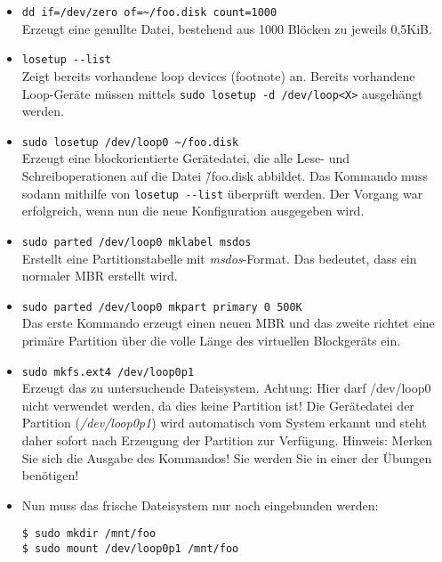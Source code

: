 \documentclass[11pt,a4paper]{article}
\def\inlinebash{\lstinline[style=bash]}
\begin{document}
\begin{itemize}
\item \inlinebash$dd if=/dev/zero of=~/foo.disk count=1000$\\
	Erzeugt eine genullte Datei, bestehend aus 1000 Blöcken zu jeweils 0,5KiB.

\item \inlinebash$losetup --list$\\
	Zeigt bereits vorhandene loop devices (footnote) an. Bereits vorhandene Loop-Geräte
	müssen mittels \inlinebash$sudo losetup -d /dev/loop<X>$ ausgehängt werden. 

\item \inlinebash$sudo losetup /dev/loop0 ~/foo.disk$\\
	Erzeugt eine blockorientierte Gerätedatei, die alle Lese- und Schreiboperationen
	auf die Datei \~/foo.disk abbildet. Das Kommando muss sodann mithilfe von
	\inlinebash$losetup --list$ überprüft werden. Der Vorgang war erfolgreich, 
	wenn nun die neue Konfiguration ausgegeben wird.

\item \inlinebash$sudo parted /dev/loop0 mklabel msdos$\\
	Erstellt eine Partitionstabelle mit \emph{msdos}-Format. Das bedeutet, dass
	ein normaler MBR erstellt wird.
	
\item \inlinebash$sudo parted /dev/loop0 mkpart primary 0 500K$\\
	Das erste Kommando erzeugt einen neuen MBR und das zweite
	richtet eine primäre Partition über die volle Länge des
	virtuellen Blockgeräts ein.

\item \inlinebash$sudo mkfs.ext4 /dev/loop0p1$\\
	Erzeugt das zu untersuchende Dateisystem. Achtung: Hier darf
	/dev/loop0 nicht verwendet werden, da dies keine Partition ist!
	Die Gerätedatei der Partition (\emph{/dev/loop0p1}) wird automatisch
	vom System erkannt und steht daher sofort nach Erzeugung der
	Partition zur Verfügung. Hinweis: Merken Sie sich die Ausgabe des
	Kommandos! Sie werden Sie in einer der Übungen benötigen!

\item
Nun muss das frische Dateisystem nur noch eingebunden werden:

\begin{lstlisting}[style=bash]
$ sudo mkdir /mnt/foo
$ sudo mount /dev/loop0p1 /mnt/foo
\end{lstlisting}
\end{itemize}
\end{document}
